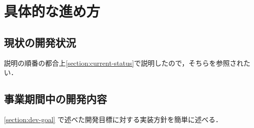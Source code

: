 \section{具体的な進め方}

\subsection{現状の開発状況}

説明の順番の都合上\ref{section:current-status}で説明したので，そちらを参照されたい．

\subsection{事業期間中の開発内容}
\label{section:dev-plan-detail}

\ref{section:dev-goal} で述べた開発目標に対する実装方針を簡単に述べる．

